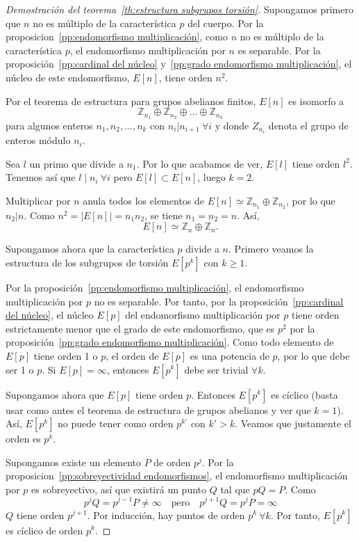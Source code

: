 \begin{proof}[Demostración del teorema~\ref{th:estructura subgrupos torsión}]
Supongamos primero que $n$ no es múltiplo de la característica $p$ del cuerpo. Por la proposicion~\ref{pp:endomorfismo multiplicación}, como $n$ no es múltiplo de la característica $p$, el endomorfismo multiplicación por $n$ es separable. Por la proposición~\ref{pp:cardinal del núcleo} y~\ref{pp:grado endomorfismo multiplicación}, el núcleo de este endomorfismo, $E[n]$, tiene orden $n^2$.

Por el teorema de estructura para grupos abelianos finitos, $E[n]$ es isomorfo a
$$
	\mathbb{Z}_{n_1} \oplus \mathbb{Z}_{n_2} \oplus \ldots \oplus \mathbb{Z}_{n_k}
$$
para algunos enteros $n_1, n_2, ..., n_k$ con $n_i | n_{i+1} \ \forall i$ y donde $Z_{n_i}$ denota el grupo de enteros módulo $n_i$.

Sea $l$ un primo que divide a $n_1$. Por lo que acabamos de ver, $E[l]$ tiene orden $l^2$. Tenemos así que $l \mid n_i \ \forall i$ pero $E[l] \subset E[n]$, luego $k = 2$.

Multiplicar por $n$ anula todos los elementos de $E[n] \simeq \mathbb{Z}_{n_1} \oplus \mathbb{Z}_{n_2}$, por lo que $n_2 | n$. Como $n^2 = \left\vert{E[n] }\right\vert = n_1 n_2$, se tiene $n_1 = n_2 = n$. Así,
$$
	E[n] \simeq \mathbb{Z}_n \oplus \mathbb{Z}_n.
$$

Supongamos ahora que la característica $p$ divide a $n$. Primero veamos la estructura de los subgrupos de torsión $E[p^k]$ con $k \ge 1$.

Por la proposición~\ref{pp:endomorfismo multiplicación}, el endomorfismo multiplicación por $p$ no es separable. Por tanto, por la proposición~\ref{pp:cardinal del núcleo}, el núcleo $E[p]$ del endomorfismo multiplicación por $p$ tiene orden estrictamente menor que el grado de este endomorfismo, que es $p^2$ por la proposición~\ref{pp:grado endomorfismo multiplicación}. Como todo elemento de $E[p]$ tiene orden 1 o $p$, el orden de $E[p]$ es una potencia de $p$, por lo que debe ser 1 o $p$. Si $E[p] = {\infty}$, entonces $E[p^k]$ debe ser trivial $\forall k$.

Supongamos ahora que $E[p]$ tiene orden $p$. Entonces $E[p^k]$ es cíclico (basta usar como antes el teorema de estructura de grupos abelianos y ver que $k = 1$). Así, $E[p^k]$ no puede tener como orden $p^{k'}$ con $k' > k$. Veamos que justamente el orden es $p^k$.

Supongamos existe un elemento $P$ de orden $p^j$. Por la proposicion~\ref{pp:sobreyectividad endomorfismos}, el endomorfismo multiplicación por $p$ es sobreyectivo, así que existirá un punto $Q$ tal que $p Q = P$. Como
$$
	p^j Q = p^{j-1} P \neq \infty \quad \textrm{pero} \quad p^{j+1} Q = p^j P = \infty
$$
$Q$ tiene orden $p^{j+1}$. Por inducción, hay puntos de orden $p^k \ \forall k$. Por tanto, $E[p^k]$ es cíclico de orden $p^k$.


\end{proof}
